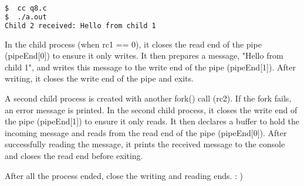 \documentclass[10pt, answers]{exam}
\begin{document}
\begin{questions}
\begin{solution}
\begin{lstlisting}[language=bash]
$  cc q8.c
$  ./a.out  
Child 2 received: Hello from child 1  
\end{lstlisting}

In the child process (when rc1 == 0), it closes the read end of the pipe (pipeEnd[0]) to ensure it only writes. It then prepares a message, "Hello from child 1", and writes this message to the write end of the pipe (pipeEnd[1]). After writing, it closes the write end of the pipe and exits.

A second child process is created with another fork() call (rc2). If the fork fails, an error message is printed.
In the second child process, it closes the write end of the pipe (pipeEnd[1]) to ensure it only reads. It then declares a buffer to hold the incoming message and reads from the read end of the pipe (pipeEnd[0]). After successfully reading the message, it prints the received message to the console and closes the read end before exiting.

After all the process ended, close the writing and reading ends. : )

\end{solution}

\end{questions}
\end{document}
